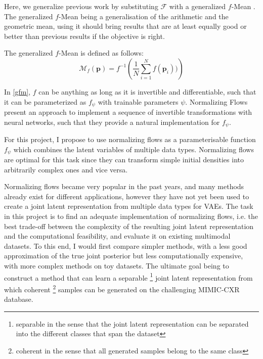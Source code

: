 
Here, we generalize previous work by substituting $\mathcal{F}$ with a generalized $f$-Mean \parencite{niculescu_convex_2018}.
The generalized $f$-Mean being a generalisation of the arithmetic and the geometric mean, using it should bring results that are at least equally good or better than previous results if the objective is right.

The generalized $f$-Mean is defined as follows:
\begin{equation}
    \label{gfm}
    \mathcal{M}_{f}\left( \textbf{p} \right) = f^{-1}\left( \frac{1}{N} \sum ^N _{i=1} f(\textbf{p}_i)) \right)
\end{equation}

In \cref{gfm}, $f$ can be anything as long as it is invertible and differentiable, such that it can be parameterized as $f_{\psi}$ with trainable parameters $\psi$.
Normalizing Flows \parencite{papamakarios_normalizing_2019} present an approach to implement a sequence of invertible transformations with neural networks, such that they provide a natural implementation for $f_{\psi}$.






For this project, I propose to use normalizing flows as a parameterisable function $f_\psi$ which combines the latent variables of multiple data types.
Normalizing flows are optimal for this task since they can transform simple initial densities into arbitrarily complex ones and vice versa.

Normalizing flows became very popular in the past years, and many methods already exist for different applications, however they have not yet been used to create a joint latent representation from multiple data types for VAEs.
The task in this project is to find an adequate implementation of normalizing flows, i.e. the best trade-off between the complexity of the resulting joint latent representation and the computational feasibility, and evaluate it on existing multimodal datasets.
To this end, I would first compare simpler methods, with a less good approximation of the true joint posterior but less computationally expensive, with more complex methods on toy datasets.
The ultimate goal being to construct a method that can learn a separable \footnote{separable in the sense that the joint latent representation can be separated into the different classes that span the dataset} joint latent representation from which coherent \footnote{coherent in the sense that all generated samples belong to the same class} samples can be generated on the challenging MIMIC-CXR \parencite{johnson_mimic-cxr-jpg_2019} database.